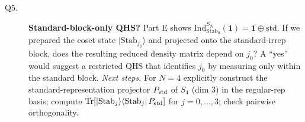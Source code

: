 \begin{description}
\item[Q5.] \textbf{Standard-block-only QHS?}  Part E shows
$\mathrm{Ind}_{\mathrm{Stab}_0}^{S_N}(\mathbf 1) = \mathbf 1 \oplus
\mathrm{std}$.  If we prepared the coset state
$|\mathrm{Stab}_{j_0}\rangle$ and projected onto the standard-irrep
block, does the resulting reduced density matrix depend on $j_0$?  A
``yes'' would suggest a restricted QHS that identifies $j_0$ by
measuring only within the standard block.
\emph{Next steps.} For $N=4$ explicitly construct the
standard-representation projector $P_{\rm std}$ of $S_4$ (dim $3$) in
the regular-rep basis; compute
$\mathrm{Tr}[|\mathrm{Stab}_j\rangle\langle\mathrm{Stab}_j|\,P_{\rm std}]$
for $j=0,\dots,3$; check pairwise orthogonality.

\end{description}
